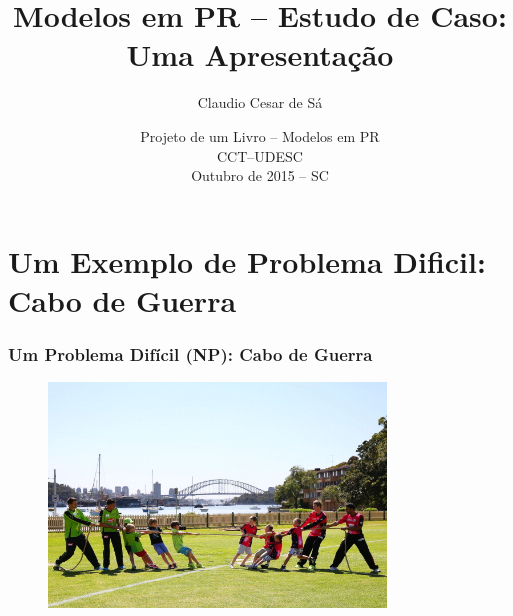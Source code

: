 \documentclass{beamer}
\title[Modelos em PR -- Estudo de Caso] %
{Modelos em PR -- Estudo de Caso: \\ Uma Apresentação}
\author[Claudio Cesar de Sá] %
{Claudio Cesar de Sá\inst{1}}
\institute[] %
{
  \inst{1}%
  Departamento de Ciência da Computação -- DCC\\
  Centro de Ciências Tecnológicas -- CCT\\
 Universidade do Estado de Santa Catarina -- UDESC
}
\date[01 out 2015] %
{Projeto de um Livro -- Modelos em PR\\
CCT--UDESC\\ Outubro de 2015 -- SC}
\begin{document}
\begin{frame}
  \titlepage
\end{frame}









\section{Um Exemplo de Problema Dificil: Cabo de Guerra}


\begin{frame}
\frametitle{Um Problema Difícil (NP): Cabo de Guerra}

\begin{figure}[ht!]
 \centering
 \includegraphics[width=0.8\textwidth , height=0.6\textheight]{../figuras/cabo-de-guerra.jpg}
\end{figure}


\end{frame}
\end{document}
